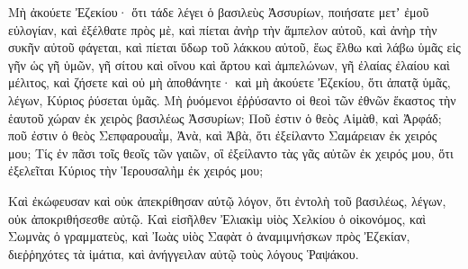 {Μὴ ἀκούετε Ἐζεκίου· ὅτι τάδε λέγει ὁ βασιλεὺς Ἀσσυρίων, ποιήσατε μετʼ ἐμοῦ εὐλογίαν, καὶ ἐξέλθατε πρὸς μὲ, καὶ πίεται ἀνὴρ τὴν ἄμπελον αὐτοῦ, καὶ ἀνὴρ τὴν συκῆν αὐτοῦ φάγεται, καὶ πίεται ὕδωρ τοῦ λάκκου αὐτοῦ,
ἕως ἔλθω καὶ λάβω ὑμᾶς εἰς γῆν ὡς γῆ ὑμῶν, γῆ σίτου καὶ οἴνου καὶ ἄρτου καὶ ἀμπελώνων, γῆ ἐλαίας ἐλαίου καὶ μέλιτος, καὶ ζήσετε καὶ οὐ μὴ ἀποθάνητε· καὶ μὴ ἀκούετε Ἐζεκίου, ὅτι ἀπατᾷ ὑμᾶς, λέγων, Κύριος ῥύσεται ὑμᾶς.
Μὴ ῥυόμενοι ἐῤῥύσαντο οἱ θεοὶ τῶν ἐθνῶν ἕκαστος τὴν ἑαυτοῦ χώραν ἐκ χειρὸς βασιλέως Ἀσσυρίων;
Ποῦ ἐστιν ὁ θεὸς Αἱμὰθ, καὶ Ἀρφάδ; ποῦ ἐστιν ὁ θεὸς Σεπφαρουαῒμ, Ἀνὰ, καὶ Ἀβὰ, ὅτι ἐξείλαντο Σαμάρειαν ἐκ χειρός μου;
Τίς ἐν πᾶσι τοῖς θεοῖς τῶν γαιῶν, οἳ ἐξείλαντο τὰς γᾶς αὐτῶν ἐκ χειρός μου, ὅτι ἐξελεῖται Κύριος τὴν Ἱερουσαλὴμ ἐκ χειρός μου;
\par }{\PP {}Καὶ ἐκώφευσαν καὶ οὐκ ἀπεκρίθησαν αὐτῷ λόγον, ὅτι ἐντολὴ τοῦ βασιλέως, λέγων, οὐκ ἀποκριθήσεσθε αὐτῷ.
Καὶ εἰσῆλθεν Ἐλιακὶμ υἱὸς Χελκίου ὁ οἰκονόμος, καὶ Σωμνὰς ὁ γραμματεὺς, καὶ Ἰωὰς υἱὸς Σαφὰτ ὁ ἀναμιμνήσκων πρὸς Ἐζεκίαν, διεῤῥηχότες τὰ ἱμάτια, καὶ ἀνήγγειλαν αὐτῷ τοὺς λόγους Ῥαψάκου.

}
